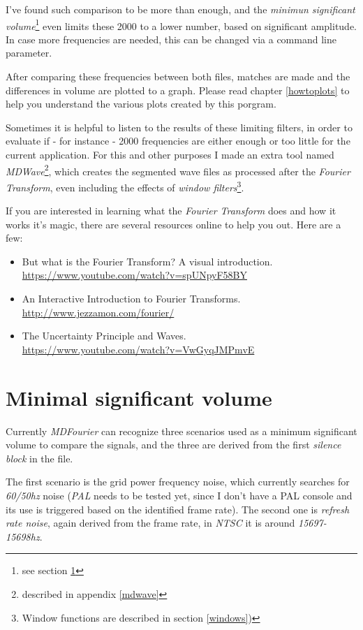 \documentclass[10pt,a4paper]{report}
\begin{document}
I've found such comparison to be more than enough, and the \textit{minimun significant volume}\footnote{  see section \ref{MinSigVolume}} even limits these 2000 to a lower number, based on significant amplitude. In case more frequencies are needed, this can be changed via a command line parameter.

After comparing these frequencies between both files, matches are made and the differences in volume are plotted to a graph. Please read chapter \ref{howtoplots} to help you understand the various plots created by this porgram.

Sometimes it is helpful to listen to the results of these limiting filters, in order to evaluate if - for instance - 2000 frequencies are either enough or too little for the current application. For this and other purposes I made an extra tool named \textit{MDWave}\footnote{described in appendix \ref{mdwave}}, which creates the segmented wave files as processed after the \textit{Fourier Transform}, even including the effects of \textit{window filters}\footnote{Window functions are described in section \ref{windows})}.

If you are interested in learning what the \textit{Fourier Transform} does and how it works it's magic, there are several resources online to help you out. Here are a few:

\begin{itemize}
	\item But what is the Fourier Transform? A visual introduction.\\ \url{https://www.youtube.com/watch?v=spUNpyF58BY}
	\item An Interactive Introduction to Fourier Transforms.\\ \url{http://www.jezzamon.com/fourier/}
	\item The Uncertainty Principle and Waves.\\
	\url{https://www.youtube.com/watch?v=VwGyqJMPmvE}
\end{itemize}

\section{Minimal significant volume}
\label{MinSigVolume}

Currently \textit{MDFourier} can recognize three scenarios used as a minimum significant volume to compare the signals, and the three are derived from the first \textit{silence block} in the file.

The first scenario is the grid power frequency noise, which currently searches for \textit{60/50hz} noise (\textit{PAL} needs to be tested yet, since I don't have a PAL console and its use is triggered based on the identified frame rate). The second one is \textit{refresh rate noise}, again derived from the frame rate, in \textit{NTSC} it is around \textit{15697-15698hz}. 
\end{document}
